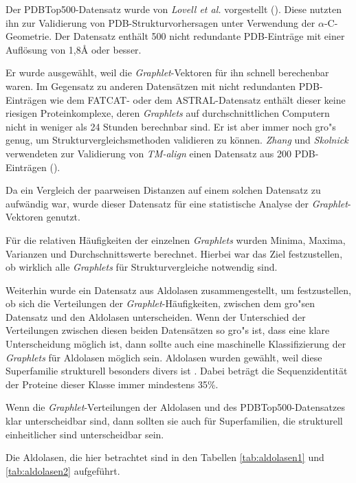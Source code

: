 \documentclass{report}
\begin{document}
Der PDBTop500-Datensatz wurde von \textit{Lovell et al.} vorgestellt (\cite{top500}). Diese nutzten ihn zur Validierung von PDB-Strukturvorhersagen unter Verwendung der $\alpha$-C-Geometrie.
Der Datensatz enth\"alt 500 nicht redundante PDB-Eintr\"age mit einer Aufl\"osung von 1,8\AA{}  oder besser.

Er wurde ausgew\"ahlt, weil die \textit{Graphlet}-Vektoren f\"ur ihn schnell berechenbar waren. Im Gegensatz zu anderen Datens\"atzen mit nicht redundanten PDB-Eintr\"agen wie dem FATCAT- oder dem ASTRAL-Datensatz enth\"alt dieser keine riesigen Proteinkomplexe, deren \textit{Graphlets} auf durchschnittlichen Computern nicht in weniger als 24 Stunden berechnbar sind. 
Er ist aber immer noch gro"s genug, um Strukturvergleichsmethoden validieren zu k\"onnen. \textit{Zhang} und \textit{Skolnick} verwendeten zur Validierung von \textit{TM-align} einen Datensatz aus 200 PDB-Eintr\"agen (\cite{zhangtm}).

Da ein Vergleich der paarweisen Distanzen auf einem solchen Datensatz zu aufw\"andig war, wurde dieser Datensatz f\"ur eine statistische Analyse der \textit{Graphlet}-Vektoren genutzt.

F\"ur die relativen H\"aufigkeiten der einzelnen \textit{Graphlets} wurden Minima, Maxima, Varianzen und Durchschnittswerte berechnet. Hierbei war das Ziel festzustellen, ob wirklich alle \textit{Graphlets} f\"ur Strukturvergleiche notwendig sind.

Weiterhin wurde ein Datensatz aus Aldolasen zusammengestellt, um festzustellen, ob sich die Verteilungen der \textit{Graphlet}-H\"aufigkeiten, zwischen dem gro"sen Datensatz und den Aldolasen unterscheiden. Wenn der Unterschied der Verteilungen zwischen diesen beiden Datens\"atzen so gro"s ist, dass eine klare Unterscheidung m\"oglich ist, dann sollte auch eine maschinelle Klassifizierung der \textit{Graphlets} f\"ur Aldolasen m\"oglich sein. Aldolasen wurden gew\"ahlt, weil diese Superfamilie strukturell besonders divers ist \cite{das2015diversity}. Dabei betr\"agt die Sequenzidentit\"at der Proteine dieser Klasse immer mindestens 35\%.

Wenn die \textit{Graphlet}-Verteilungen der Aldolasen und des PDBTop500-Datensatzes klar unterscheidbar sind, dann sollten sie auch f\"ur Superfamilien, die strukturell einheitlicher sind unterscheidbar sein.

Die Aldolasen, die hier betrachtet sind in den Tabellen \ref{tab:aldolasen1} und \ref{tab:aldolasen2} aufgef\"uhrt.
\end{document}
